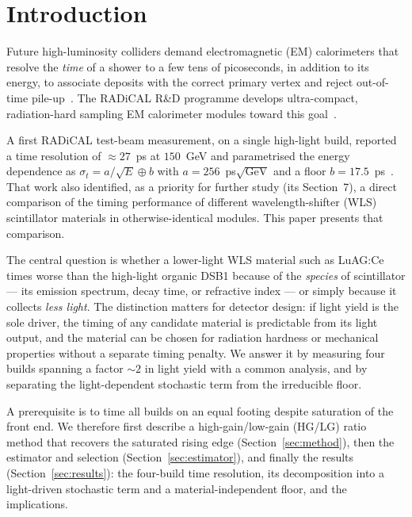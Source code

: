 \documentclass[final,5p,times,twocolumn]{elsarticle}
\begin{document}
\section{Introduction}
\label{sec:intro}

Future high-luminosity colliders demand electromagnetic (EM) calorimeters that resolve
the \emph{time} of a shower to a few tens of picoseconds, in addition to its energy,
to associate deposits with the correct primary vertex and reject out-of-time
pile-up~\cite{cmsmtd}. The RADiCAL R\&D programme develops ultra-compact,
radiation-hard sampling EM calorimeter modules toward this goal~\cite{radical}.

A first RADiCAL test-beam measurement, on a single high-light build, reported a time
resolution of $\approx\!27$~ps at $150$~GeV and parametrised the energy dependence as
$\sigma_t = a/\sqrt{E}\oplus b$ with $a=256$~ps$\sqrt{\mathrm{GeV}}$ and a floor
$b=17.5$~ps~\cite{radical}. That work also identified, as a priority for further study
(its Section~7), a direct comparison of the timing performance of different
wavelength-shifter (WLS) scintillator materials in otherwise-identical modules. This
paper presents that comparison.

The central question is whether a lower-light WLS material such as LuAG:Ce times worse
than the high-light organic DSB1 because of the \emph{species} of scintillator --- its
emission spectrum, decay time, or refractive index --- or simply because it collects
\emph{less light}. The distinction matters for detector design: if light yield is the
sole driver, the timing of any candidate material is predictable from its light output,
and the material can be chosen for radiation hardness or mechanical properties without a
separate timing penalty. We answer it by measuring four builds spanning a factor
$\sim2$ in light yield with a common analysis, and by separating the light-dependent
stochastic term from the irreducible floor.

A prerequisite is to time all builds on an equal footing despite saturation of the
front end. We therefore first describe a high-gain/low-gain (HG/LG) ratio method that
recovers the saturated rising edge (Section~\ref{sec:method}), then the estimator and
selection (Section~\ref{sec:estimator}), and finally the results
(Section~\ref{sec:results}): the four-build time resolution, its decomposition into a
light-driven stochastic term and a material-independent floor, and the implications.
\end{document}

